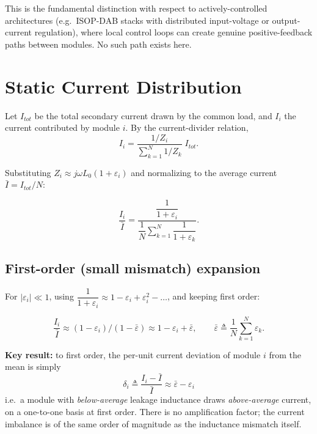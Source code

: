\documentclass[11pt,a4paper]{article}
\begin{document}
This is the fundamental distinction with respect to actively-controlled architectures (e.g.\ ISOP-DAB stacks with distributed input-voltage or output-current regulation), where local control loops can create genuine positive-feedback paths between modules. No such path exists here.

\section{Static Current Distribution}

Let $I_{tot}$ be the total secondary current drawn by the common load, and $I_i$ the current contributed by module $i$. By the current-divider relation,
\begin{equation}
I_i = \frac{1/Z_i}{\displaystyle\sum_{k=1}^N 1/Z_k}\; I_{tot}.
\end{equation}

Substituting $Z_i \approx j\omega L_0 (1+\varepsilon_i)$ and normalizing to the average current $\bar I = I_{tot}/N$:

\begin{equation}
\frac{I_i}{\bar I} = \frac{\dfrac{1}{1+\varepsilon_i}}{\dfrac{1}{N}\displaystyle\sum_{k=1}^N \dfrac{1}{1+\varepsilon_k}}.
\end{equation}

\subsection{First-order (small mismatch) expansion}

For $|\varepsilon_i|\ll 1$, using $\dfrac{1}{1+\varepsilon_i} \approx 1-\varepsilon_i+\varepsilon_i^2-\dots$, and keeping first order:

\begin{equation}
\frac{I_i}{\bar I} \approx \left(1-\varepsilon_i\right)\Big/\left(1-\bar\varepsilon\right) \approx 1-\varepsilon_i+\bar\varepsilon,
\qquad \bar\varepsilon \triangleq \frac{1}{N}\sum_{k=1}^N \varepsilon_k.
\end{equation}

\textbf{Key result:} to first order, the per-unit current deviation of module $i$ from the mean is simply
\begin{equation}
\boxed{\;\delta_i \triangleq \frac{I_i-\bar I}{\bar I} \approx \bar\varepsilon-\varepsilon_i\;}
\end{equation}
i.e.\ a module with \emph{below-average} leakage inductance draws \emph{above-average} current, on a one-to-one basis at first order. There is no amplification factor; the current imbalance is of the same order of magnitude as the inductance mismatch itself.
\end{document}
